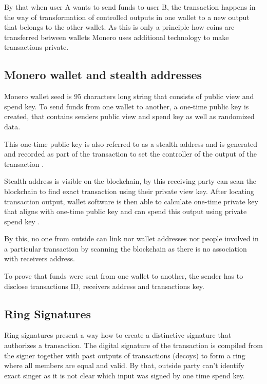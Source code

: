 \documentclass[
  printed, %
  table,   %
  nolof,     %
  nolot,     %
           oneside, color
]{fithesis3}
\begin{document}
By that when user A wants to send funds to user B, the transaction happens in the way of transformation of controlled outputs in one wallet to a new output that belongs to the other wallet. As this is only a principle how coins are transferred between wallets Monero uses additional technology to make transactions private.
\subsection{Monero wallet and stealth addresses}
\label{sec:stealthaddresses}
Monero wallet seed is 95 characters long string that consists of public view and spend key. To send funds from one wallet to another, a one-time public key is created, that contains senders public view and spend key as well as randomized data. 

This one-time public key is also referred to as a stealth address and is generated and recorded as part of the transaction to set the controller of the output of the transaction \cite{seguias2018monero}.

Stealth address is visible on the blockchain, by this receiving party can scan the blockchain to find exact transaction using their private view key. After locating transaction output, wallet software is then able to calculate one-time private key that aligns with one-time public key and can spend this output using private spend key \cite{courtois2017stealth}.

By this, no one from outside can link nor wallet addresses nor people involved in a particular transaction by scanning the blockchain as there is no association with receivers address.

To prove that funds were sent from one wallet to another, the sender has to disclose transactions ID, receivers address and transactions key.

\subsection{Ring Signatures}
\label{sec:ringsignatures}
Ring signatures present a way how to create a distinctive signature that authorizes a transaction. The digital signature of the transaction is compiled from the signer together with past outputs of transactions (decoys) to form a ring where all members are equal and valid. By that, outside party can't identify exact singer as it is not clear which input was signed by one time spend key\cite{mercer2016privacy}.
\end{document}
